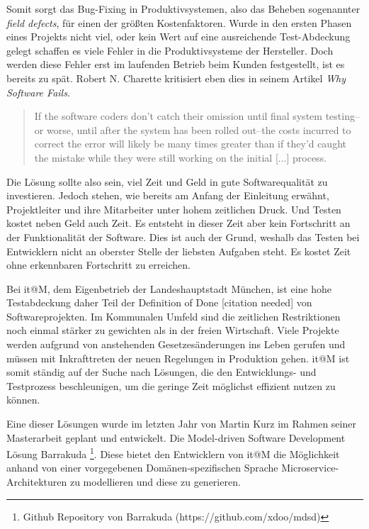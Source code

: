 \documentclass[12pt,a4paper,bibliography=totocnumbered,listof=totocnumbered]{scrartcl}
\begin{document}
Somit sorgt das Bug-Fixing in Produktivsystemen, also das Beheben sogenannter \textit{field defects}, für einen der größten Kostenfaktoren. Wurde in den ersten Phasen eines Projekts nicht viel, oder kein Wert auf eine ausreichende Test-Abdeckung gelegt schaffen es viele Fehler in die Produktivsysteme der Hersteller. Doch werden diese Fehler erst im laufenden Betrieb beim Kunden festgestellt, ist es bereits zu spät. Robert N. Charette kritisiert eben dies in seinem Artikel \textit{Why Software Fails}.

\begin{quote}
	\begin{itshape}
		If the software coders don't catch their omission until final system testing--or worse, until after the system has been rolled out--the costs incurred to correct the error will likely be many times greater than if they'd caught the mistake while they were still working on the initial [...] process.\cite{charette}
	\end{itshape}
\end{quote}

Die Lösung sollte also sein, viel Zeit und Geld in gute Softwarequalität zu investieren. Jedoch stehen, wie bereits am Anfang der Einleitung erwähnt, Projektleiter und ihre Mitarbeiter unter hohem zeitlichen Druck. Und Testen kostet neben Geld auch Zeit. Es entsteht in dieser Zeit aber kein Fortschritt an der Funktionalität der Software. Dies ist auch der Grund, weshalb das Testen bei Entwicklern nicht an oberster Stelle der liebsten Aufgaben steht. Es kostet Zeit ohne erkennbaren Fortschritt zu erreichen.

Bei it@M, dem Eigenbetrieb der Landeshauptstadt München, ist eine hohe Testabdeckung daher Teil der Definition of Done [citation needed] von Softwareprojekten. Im Kommunalen Umfeld sind die zeitlichen Restriktionen noch einmal stärker zu gewichten als in der freien Wirtschaft. Viele Projekte werden aufgrund von anstehenden Gesetzesänderungen ins Leben gerufen und müssen mit Inkrafttreten der neuen Regelungen in Produktion gehen. it@M ist somit ständig auf der Suche nach Lösungen, die den Entwicklungs- und Testprozess beschleunigen, um die geringe Zeit möglichst effizient nutzen zu können.

Eine dieser Lösungen wurde im letzten Jahr von Martin Kurz im Rahmen seiner Masterarbeit geplant und entwickelt. Die Model-driven Software Development Lösung Barrakuda \footnote{Github Repository von Barrakuda (https://github.com/xdoo/mdsd)}. Diese bietet den Entwicklern von it@M die Möglichkeit anhand von einer vorgegebenen Domänen-spezifischen Sprache Microservice-Architekturen zu modellieren und diese zu generieren.
\end{document}
